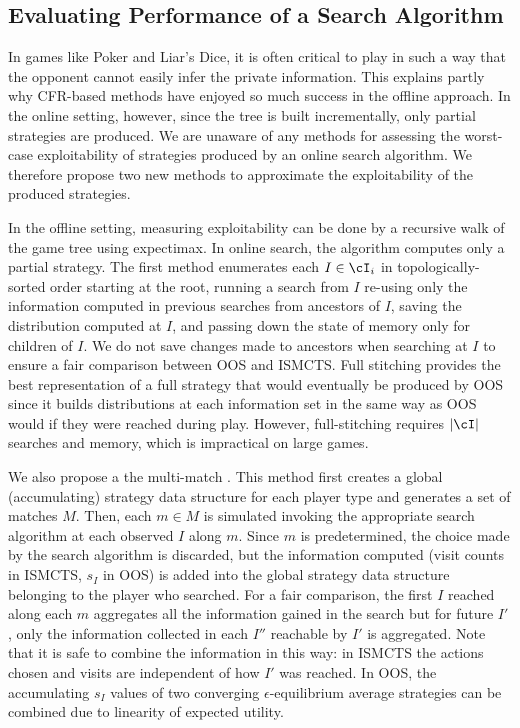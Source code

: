 \subsection{Evaluating Performance of a Search Algorithm} 

In games like Poker and Liar's Dice, it is often critical to play in such a way that the opponent 
cannot easily infer the private information. This explains partly why CFR-based methods have 
enjoyed so much success in the offline approach. 
In the online setting, however, since the tree is built incrementally, only partial strategies
are produced. 
We are unaware of any methods for assessing the worst-case exploitability of strategies 
produced by an online search algorithm. 
We therefore propose two new methods to approximate the exploitability of the produced strategies. 

In the offline setting, measuring exploitability can be done by a recursive walk of the game 
tree using expectimax. In online search, the algorithm computes only 
a partial strategy. 
The first  method 
enumerates each $I \in \cI_i$ in topologically-sorted order starting at the root, 
running a search from $I$ re-using only the information computed in previous searches from ancestors of $I$, saving the 
distribution computed at $I$, and passing down the state of memory only for children of $I$. 
We do not save changes made to ancestors when searching at $I$ to ensure 
a fair comparison between OOS and ISMCTS. Full stitching provides the best representation of a full strategy
that would eventually be produced by OOS since it builds distributions at each information set in the 
same way as OOS would if they were reached during play.
However, full-stitching requires $|\cI|$ searches and memory, which is impractical on large games. 

We also propose a the multi-match . 
This method first creates a global (accumulating) strategy data structure for each player type and generates a 
set of matches $M$. Then, each $m \in M$ is simulated invoking the appropriate search algorithm at each observed 
$I$ along $m$. 
Since $m$ is predetermined, the choice made by the search algorithm is discarded, but the information computed 
(visit counts in ISMCTS, $s_I$ in OOS) is added into the global strategy data structure belonging to the player
who searched. 
For a fair comparison, the first $I$ reached along each $m$ aggregates all the information gained in the search 
but for future $I'$, only the information collected in each $I''$ reachable by $I'$ is aggregated.
Note that it is safe to combine the information in this way: in ISMCTS the actions chosen and visits are independent of 
how $I'$ was reached. In OOS, the accumulating $s_I$ values of two converging $\epsilon$-equilibrium average 
strategies can be combined due to linearity of expected utility. 

